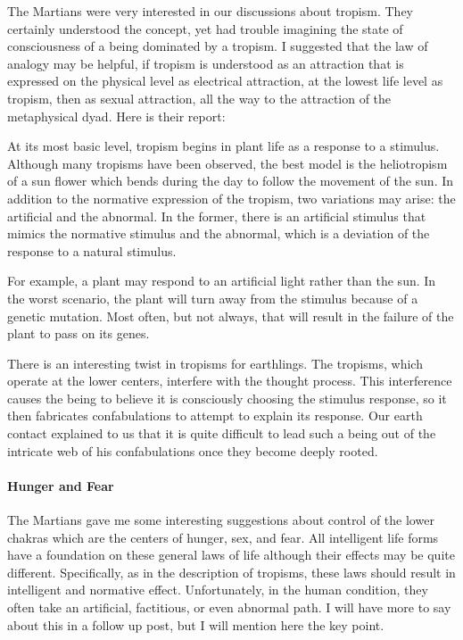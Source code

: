 The Martians were very interested in our discussions about tropism. They certainly understood the concept, yet had trouble imagining the state of consciousness of a being dominated by a tropism. I suggested that the law of analogy may be helpful, if tropism is understood as an attraction that is expressed on the physical level as electrical attraction, at the lowest life level as tropism, then as sexual attraction, all the way to the attraction of the metaphysical dyad. Here is their report:

\begin{quotationx}
At its most basic level, tropism begins in plant life as a response to a stimulus. Although many tropisms have been observed, the best model is the heliotropism of a sun flower which bends during the day to follow the movement of the sun. In addition to the normative expression of the tropism, two variations may arise: the artificial and the abnormal. In the former, there is an artificial stimulus that mimics the normative stimulus and the abnormal, which is a deviation of the response to a natural stimulus.

For example, a plant may respond to an artificial light rather than the sun. In the worst scenario, the plant will turn away from the stimulus because of a genetic mutation. Most often, but not always, that will result in the failure of the plant to pass on its genes.

There is an interesting twist in tropisms for earthlings. The tropisms, which operate at the lower centers, interfere with the thought process. This interference causes the being to believe it is consciously choosing the stimulus response, so it then fabricates confabulations to attempt to explain its response. Our earth contact explained to us that it is quite difficult to lead such a being out of the intricate web of his confabulations once they become deeply rooted.
\end{quotationx}


\paragraph{Hunger and Fear}


The Martians gave me some interesting suggestions about control of the lower chakras which are the centers of hunger, sex, and fear. All intelligent life forms have a foundation on these general laws of life although their effects may be quite different. Specifically, as in the description of tropisms, these laws should result in intelligent and normative effect. Unfortunately, in the human condition, they often take an artificial, factitious, or even abnormal path. I will have more to say about this in a follow up post, but I will mention here the key point.

